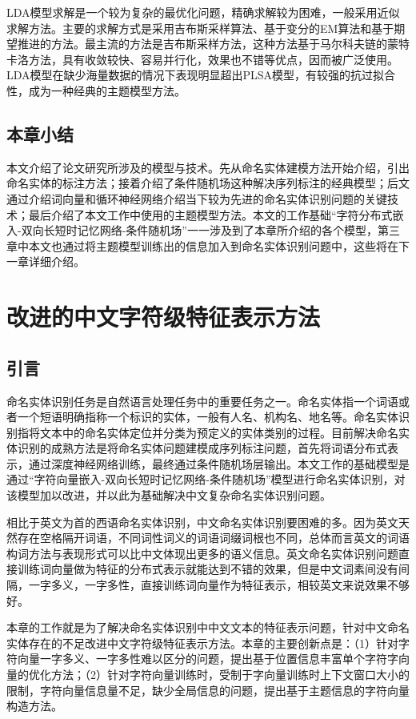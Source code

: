 \documentclass[winfonts,master,oneside,nobackinfo]{njuthesis}
\begin{document}
LDA模型求解是一个较为复杂的最优化问题，精确求解较为困难，一般采用近似求解方法。主要的求解方式是采用吉布斯采样算法、基于变分的EM算法和基于期望推进的方法。最主流的方法是吉布斯采样方法，这种方法基于马尔科夫链的蒙特卡洛方法，具有收敛较快、容易并行化，效果也不错等优点，因而被广泛使用。LDA模型在缺少海量数据的情况下表现明显超出PLSA模型，有较强的抗过拟合性，成为一种经典的主题模型方法。

\section{本章小结}

本文介绍了论文研究所涉及的模型与技术。先从命名实体建模方法开始介绍，引出命名实体的标注方法；接着介绍了条件随机场这种解决序列标注的经典模型；后文通过介绍词向量和循环神经网络介绍当下较为先进的命名实体识别问题的关键技术；最后介绍了本文工作中使用的主题模型方法。本文的工作基础“字符分布式嵌入-双向长短时记忆网络-条件随机场”一一涉及到了本章所介绍的各个模型，第三章中本文也通过将主题模型训练出的信息加入到命名实体识别问题中，这些将在下一章详细介绍。

\chapter{改进的中文字符级特征表示方法}

\section{引言}

命名实体识别任务是自然语言处理任务中的重要任务之一。命名实体指一个词语或者一个短语明确指称一个标识的实体，一般有人名、机构名、地名等。命名实体识别指将文本中的命名实体定位并分类为预定义的实体类别的过程。目前解决命名实体识别的成熟方法是将命名实体问题建模成序列标注问题，首先将词语分布式表示，通过深度神经网络训练，最终通过条件随机场层输出。本文工作的基础模型是通过“字符向量嵌入-双向长短时记忆网络-条件随机场”模型进行命名实体识别，对该模型加以改进，并以此为基础解决中文复杂命名实体识别问题。

相比于英文为首的西语命名实体识别，中文命名实体识别要困难的多。因为英文天然存在空格隔开词语，不同词性词义的词语词缀词根也不同，总体而言英文的词语构词方法与表现形式可以比中文体现出更多的语义信息。英文命名实体识别问题直接训练词向量做为特征的分布式表示就能达到不错的效果，但是中文词素间没有间隔，一字多义，一字多性，直接训练词向量作为特征表示，相较英文来说效果不够好。

本章的工作就是为了解决命名实体识别中中文文本的特征表示问题，针对中文命名实体存在的不足改进中文字符级特征表示方法。本章的主要创新点是：（1）针对字符向量一字多义、一字多性难以区分的问题，提出基于位置信息丰富单个字符字向量的优化方法；（2）针对字符向量训练时，受制于字向量训练时上下文窗口大小的限制，字符向量信息量不足，缺少全局信息的问题，提出基于主题信息的字符向量构造方法。
\end{document}
